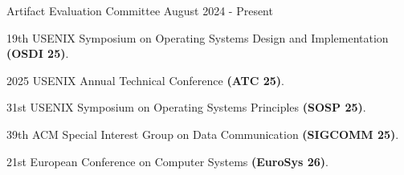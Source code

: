 

\begin{cventries}

  \extraentry
  {}
  {Artifact Evaluation Committee}
  {}
  {August 2024 - Present}
  {
    \begin{cvitems}
    \item 19th USENIX Symposium on Operating Systems Design and Implementation \textbf{(OSDI 25)}.
    \item 2025 USENIX Annual Technical Conference \textbf{(ATC 25)}.
    \item 31st USENIX Symposium on Operating Systems Principles \textbf{(SOSP 25)}.
    \item 39th ACM Special Interest Group on Data Communication \textbf{(SIGCOMM 25)}.
    \item 21st European Conference on Computer Systems \textbf{(EuroSys 26)}.
    \end{cvitems}
  }


\end{cventries}
